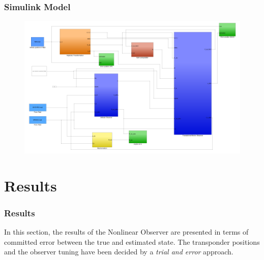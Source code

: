 \documentclass{beamer}
\begin{document}
	\begin{frame}
		\frametitle{Simulink Model}
	
		\begin{figure}[H]
			\includegraphics[scale=0.3]{continuous_mod.png}
		\end{figure}
	\end{frame}





\section{Results}
    \begin{frame}
        \frametitle{Results}
        In this section, the results of the Nonlinear Observer
        are presented in terms of committed error between the
        true and estimated state.
        The transponder positions and the observer
        tuning have been decided by
        a \textit{trial and error} approach.
    \end{frame}
\end{document}

